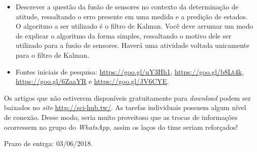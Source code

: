 \documentclass{article}
\begin{document}
\begin{itemize}
    \begin{itemize}
        \item Descrever a questão da fusão de sensores no contexto da determinação de atitude, ressaltando o erro presente em uma medida e a predição de estados. O algoritmo a ser utilizado é o filtro de Kalman. Você deve arrumar um modo de explicar o algoritmo da forma simples, ressaltando o motivo dele ser utilizado para a fusão de sensores. Haverá uma atividade voltada unicamente para o filtro de Kalman.
        \item Fontes iniciais de pesquisa: \url{https://goo.gl/uY3Hh1}, \url{https://goo.gl/b8Lt4k}, \url{https://goo.gl/6ZaaYR} e \url{https://goo.gl/JV6CYE}.
    \end{itemize}
\end{itemize}

\begin{doublespace}
\end{doublespace}

Os artigos que não estiverem disponíveis gratuitamente para \textit{download} podem ser baixados no \textit{site} \url{http://sci-hub.tw/}. As tarefas individuais possuem algum nível de conexão. Desse modo, seria muito proveitoso que as trocas de informações ocorressem no grupo do \textit{WhatsApp}, assim os laços do time seriam reforçados!

\begin{doublespace}
\end{doublespace}

Prazo de entrga: 03/06/2018.
\end{document}
